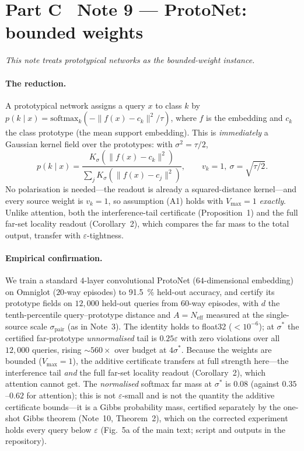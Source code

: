 \documentclass[10pt,twocolumn]{article}
\newcommand{\sstar}{\sigma^{*}}
\newcommand{\Neff}{N_{\mathrm{eff}}}
\begin{document}
\section*{Part C \textperiodcentered\ Note 9 --- ProtoNet: bounded weights}
\label{si:prototype}
\emph{This note treats prototypical networks as the bounded-weight instance.}
\paragraph{The reduction.} A prototypical network assigns a query $x$ to class $k$ by $p(k\mid x)=\mathrm{softmax}_k(-\lVert f(x)-c_k\rVert^2/\tau)$, where $f$ is the embedding and $c_k$ the class prototype (the mean support embedding). This is \emph{immediately} a Gaussian kernel field over the prototypes: with $\sigma^2=\tau/2$,
\begin{equation}
p(k\mid x)=\frac{K_\sigma(\lVert f(x)-c_k\rVert^2)}{\sum_j K_\sigma(\lVert f(x)-c_j\rVert^2)},\qquad v_k=1,\ \sigma=\sqrt{\tau/2}.
\end{equation}
No polarisation is needed---the readout is already a squared-distance kernel---and every source weight is $v_k=1$, so assumption (A1) holds with $V_{\max}=1$ \emph{exactly}. Unlike attention, both the interference-tail certificate (Proposition~1) and the full far-set locality readout (Corollary~2), which compares the far mass to the total output, transfer with $\varepsilon$-tightness.
\paragraph{Empirical confirmation.} We train a standard $4$-layer convolutional ProtoNet ($64$-dimensional embedding) on Omniglot ($20$-way episodes) to \SI{91.5}{\percent} held-out accuracy, and certify its prototype fields on $12{,}000$ held-out queries from $60$-way episodes, with $d$ the tenth-percentile query--prototype distance and $A=\Neff$ measured at the single-source scale $\sigma_{\text{pair}}$ (as in Note~3). The identity holds to float32 ($<10^{-6}$); at $\sstar$ the certified far-prototype \emph{unnormalised} tail is $0.25\varepsilon$ with zero violations over all $12{,}000$ queries, rising $\sim\!560\times$ over budget at $4\sstar$. Because the weights are bounded ($V_{\max}=1$), the additive certificate transfers at full strength here---the interference tail \emph{and} the full far-set locality readout (Corollary~2), which attention cannot get. The \emph{normalised} softmax far mass at $\sstar$ is $0.08$ (against $0.35$--$0.62$ for attention); this is not $\varepsilon$-small and is not the quantity the additive certificate bounds---it is a Gibbs probability mass, certified separately by the one-shot Gibbs theorem (Note~10, Theorem~2), which on the corrected experiment holds every query below $\varepsilon$ (Fig.~5a of the main text; script and outputs in the repository).
\end{document}
